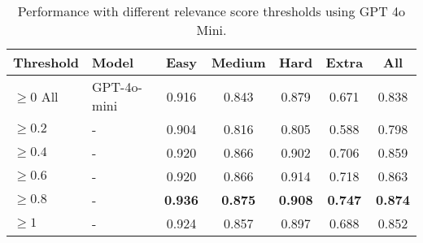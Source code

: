\begin{table*}[t]
\centering
\begin{tabular}{llccccc}
\hline
\textbf{Threshold} & \textbf{Model}& \textbf{Easy} & \textbf{Medium} & \textbf{Hard} & \textbf{Extra} & \textbf{All} \\ \hline
$\geq 0$ All & GPT-4o-mini & 0.916 & 0.843 & 0.879 & 0.671 & 0.838 \\
$\geq 0.2$ & - & 0.904 & 0.816 & 0.805 & 0.588 & 0.798 \\
$\geq 0.4$ & - & 0.920 & 0.866 & 0.902 & 0.706 & 0.859 \\
$\geq 0.6$ & - & 0.920 & 0.866 & 0.914 & 0.718 & 0.863 \\
$\geq 0.8$ & - & \textbf{0.936} & \textbf{0.875} & \textbf{0.908} & \textbf{0.747} & \textbf{0.874} \\
$\geq 1$ & - & 0.924 & 0.857 & 0.897 & 0.688 & 0.852 \\ \hline
\end{tabular}
\caption{Performance with different relevance score thresholds using GPT 4o Mini.}
\label{tab:GPT_4_mini}
\end{table*}
